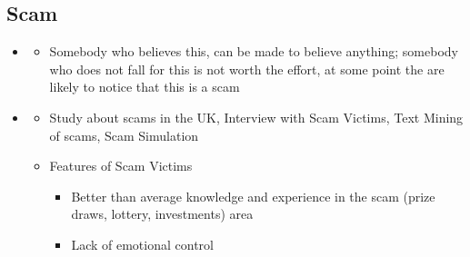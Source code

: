 \documentclass[a4paper,12pt]{scrartcl}
\begin{document}
\subsection{Scam}
\begin{itemize}
	\item
		\begin{itemize}
			\item
				Somebody who believes this, can be made to believe anything; somebody who does not fall for this is not worth the effort, at some point the are likely to notice that this is a scam
		\end{itemize}
	\item
		\begin{itemize}
			\item
				Study about scams in the UK, Interview with Scam Victims, Text Mining of scams, Scam Simulation
			\item
				Features of Scam Victims
				\begin{itemize}
					\item
						Better than average knowledge and experience in the scam (prize draws, lottery, investments) area 
					\item
						Lack of emotional control


\end{itemize}
\end{itemize}
\end{itemize}
\end{document}
